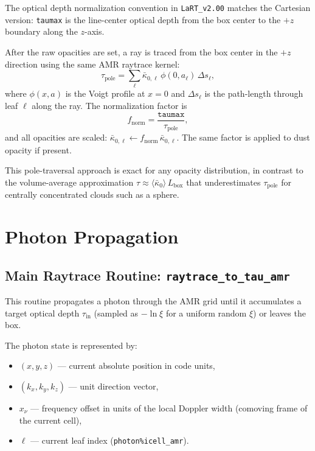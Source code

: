 \documentclass[english,a4paper]{my_memo}
\begin{document}
The optical depth normalization convention in \texttt{LaRT\_v2.00} matches the
Cartesian version: \texttt{taumax} is the line-center optical depth from the
box center to the $+z$ boundary along the $z$-axis.

After the raw opacities are set, a ray is traced from the box center in the
$+z$ direction using the same AMR raytrace kernel:
\begin{equation}
  \tau_\mathrm{pole} = \sum_{\ell}
    \bar\kappa_{0,\ell}\,\phi(0, a_\ell)\,\Delta s_\ell,
\end{equation}
where $\phi(x, a)$ is the Voigt profile at $x=0$ and $\Delta s_\ell$ is the
path-length through leaf $\ell$ along the ray.  The normalization factor is
\begin{equation}
  f_\mathrm{norm} = \frac{\texttt{taumax}}{\tau_\mathrm{pole}},
\end{equation}
and all opacities are scaled: $\bar\kappa_{0,\ell} \leftarrow f_\mathrm{norm}\,\bar\kappa_{0,\ell}$.
The same factor is applied to dust opacity if present.

This pole-traversal approach is exact for any opacity distribution, in contrast
to the volume-average approximation
$\tau \approx \langle\bar\kappa_0\rangle\,L_\mathrm{box}$
that underestimates $\tau_\mathrm{pole}$ for centrally concentrated clouds such
as a sphere.

\section{Photon Propagation}

\subsection{Main Raytrace Routine: \texttt{raytrace\_to\_tau\_amr}}
\label{sec:raytrace}

This routine propagates a photon through the AMR grid until it accumulates a
target optical depth $\tau_\mathrm{in}$ (sampled as $-\ln\xi$ for a uniform
random $\xi$) or leaves the box.

The photon state is represented by:
\begin{itemize}
  \item $(x, y, z)$ — current absolute position in code units,
  \item $(k_x, k_y, k_z)$ — unit direction vector,
  \item $x_\nu$ — frequency offset in units of the local Doppler width
        (comoving frame of the current cell),
  \item $\ell$ — current leaf index (\texttt{photon\%icell\_amr}).
\end{itemize}
\end{document}
